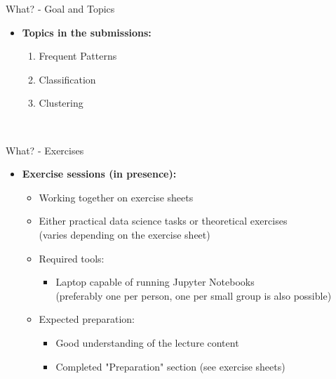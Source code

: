 \begin{frame}{What? - Goal and Topics}
\begin{itemize}
\begin{multicols}{2}
\begin{enumerate}
			      \end{enumerate}
		      \end{multicols}
		      \vspace*{-0.75\multicolsep}
		\item \textbf{Topics in the submissions:}
		      \vspace*{-1\multicolsep}
		      \begin{multicols}{2}
			      \begin{enumerate}
				      \item Frequent Patterns
				      \item Classification
				      \item Clustering
			      \end{enumerate}
		      \end{multicols}
		      \
	\end{itemize}
\end{frame}

\begin{frame}{What? - Exercises}
	\begin{itemize}
		\item \textbf{Exercise sessions (in presence):}
		      \begin{itemize}
			      \item Working together on exercise sheets
			      \item Either practical data science tasks or theoretical exercises \\
			            {\color{gray}(varies depending on the exercise sheet)}
			      \item Required tools:
			            \begin{itemize}
				            \item Laptop capable of running Jupyter Notebooks \\
				                  {\color{gray}(preferably one per person, one per small group is also possible)}
			            \end{itemize}
			      \item Expected preparation:
			            \begin{itemize}
				            \item Good understanding of the lecture content
				            \item Completed "Preparation" section (see exercise sheets)
			            \end{itemize}
		      \end{itemize}
	\end{itemize}
\end{frame}

